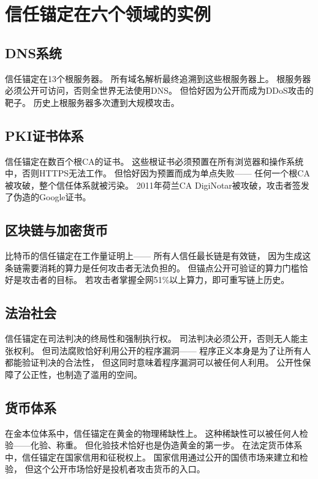 \documentclass[11pt,a4paper]{article}
\begin{document}
\section{信任锚定在六个领域的实例}

\subsection{DNS系统}

信任锚定在13个根服务器。
所有域名解析最终追溯到这些根服务器上。
根服务器必须公开可访问，否则全世界无法使用DNS。
但恰好因为公开而成为DDoS攻击的靶子。
历史上根服务器多次遭到大规模攻击。

\subsection{PKI证书体系}

信任锚定在数百个根CA的证书。
这些根证书必须预置在所有浏览器和操作系统中，否则HTTPS无法工作。
但恰好因为预置而成为单点失败——
任何一个根CA被攻破，整个信任体系就被污染。
2011年荷兰CA DigiNotar被攻破，攻击者签发了伪造的Google证书。

\subsection{区块链与加密货币}

比特币的信任锚定在工作量证明上——
所有人信任最长链是有效链，
因为生成这条链需要消耗的算力是任何攻击者无法负担的。
但锚点公开可验证的算力门槛恰好是攻击者的目标。
若攻击者掌握全网51\%以上算力，即可重写链上历史。

\subsection{法治社会}

信任锚定在司法判决的终局性和强制执行权。
司法判决必须公开，否则无人能主张权利。
但司法腐败恰好利用公开的程序漏洞——
程序正义本身是为了让所有人都能验证判决的合法性，
但这同时意味着程序漏洞可以被任何人利用。
公开性保障了公正性，也制造了滥用的空间。

\subsection{货币体系}

在金本位体系中，信任锚定在黄金的物理稀缺性上。
这种稀缺性可以被任何人检验——化验、称重。
但化验技术恰好也是伪造黄金的第一步。
在法定货币体系中，信任锚定在国家信用和征税权上。
国家信用通过公开的国债市场来建立和检验，
但这个公开市场恰好是投机者攻击货币的入口。
\end{document}
